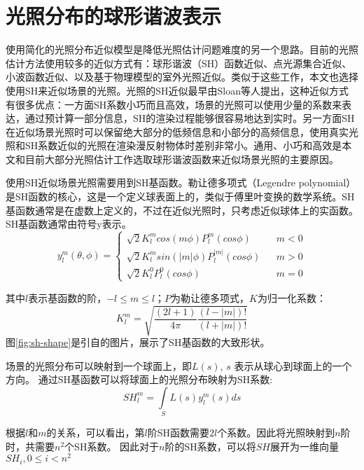 \section{光照分布的球形谐波表示}
使用简化的光照分布近似模型是降低光照估计问题难度的另一个思路。目前的光照估计方法使用较多的近似方式有：球形谐波（SH）函数近似、点光源集合近似、小波函数近似、以及基于物理模型的室外光照近似。类似于这些工作，本文也选择使用SH来近似场景的光照。光照的SH近似最早由Sloan等人\cite{sloan2002precomputed}提出，这种近似方式有很多优点：一方面SH系数小巧而且高效，场景的光照可以使用少量的系数来表达，通过预计算一部分信息，SH的渲染过程能够很容易地达到实时。另一方面SH在近似场景光照时可以保留绝大部分的低频信息和小部分的高频信息，使用真实光照和SH系数近似的光照在渲染漫反射物体时差别非常小。通用、小巧和高效是本文和目前大部分光照估计工作选取球形谐波函数来近似场景光照的主要原因。

使用SH近似场景光照需要用到SH基函数。勒让德多项式（Legendre polynomial）是SH函数的核心，这是一个定义球表面上的，类似于傅里叶变换的数学系统。SH基函数通常是在虚数上定义的，不过在近似光照时，只考虑近似球体上的实函数。SH基函数通常由符号y表示。
\begin{equation}
y^m_l(\theta, \phi)=\left\{
    \begin{array}{lcl}
        \sqrt{2}K^m_lcos(m\phi)P^m_l(cos\phi) & & {m<0}\\
        \sqrt{2}K^m_lsin(|m|\phi)P^|m|_l(cos\phi) & & {m>0}\\
        \sqrt{2}K^0_lP^0_l(cos\phi) & & {m=0}
    \end{array} \right. 
\end{equation}

其中$l$表示基函数的阶，$-l \leq m \leq l$；$P$为勒让德多项式，$K$为归一化系数：
\begin{equation}
    K^m_l=\sqrt{\frac{(2l+1)}{4\pi}\frac{(l-|m|)!}{(l+|m|)!}}
\end{equation}
图\ref{fig:sh-shape}是引自\cite{green2003spherical}的图片，展示了SH基函数的大致形状。



场景的光照分布可以映射到一个球面上，即$L(s)$, $s$ 表示从球心到球面上的一个方向。
通过SH基函数可以将球面上的光照分布映射为SH系数:
\begin{equation}
    SH^m_l = \int\limits_{S}L(s)y^m_l(s)ds
\end{equation}

根据$l$和$m$的关系，可以看出，第$l$阶SH函数需要$2l$个系数。因此将光照映射到$n$阶时，共需要$n^2$个SH系数。
因此对于$n$阶的SH系数，可以将$SH$展开为一维向量$SH_i, 0 \leq i < n^2$

